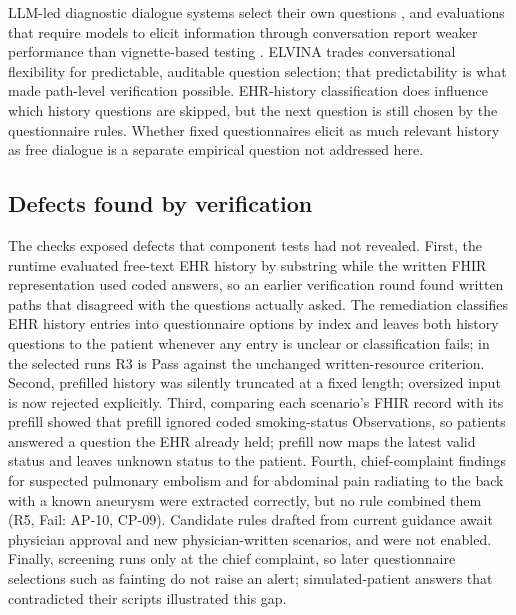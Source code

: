 \documentclass[lineno,pdflatex,sn-basic]{sn-jnl}%
\theoremstyle{thmstyleone}%
\theoremstyle{thmstyletwo}%
\theoremstyle{thmstylethree}%
\newcommand{\RThreeVerdict}{Pass}
\newcommand{\RFiveVerdict}{Fail}
\newcommand{\RFiveFailingScripts}{AP-10, CP-09}
\begin{document}
LLM-led diagnostic dialogue systems select their own questions
\citep{tuConversationalDiagnosticArtificial2025}, and evaluations that require
models to elicit information through conversation report weaker performance than
vignette-based testing \citep{johriCraftMd2025,schmidgallAgentClinic2024}. ELVINA
trades conversational flexibility for predictable, auditable question selection;
that predictability is what made path-level verification possible. EHR-history
classification does influence which history questions are skipped, but the next
question is still chosen by the questionnaire rules. Whether fixed questionnaires
elicit as much relevant history as free dialogue is a separate empirical question
not addressed here.

\subsection{Defects found by verification}
The checks exposed defects that component tests had not revealed. First, the
runtime evaluated free-text EHR history by substring while the written FHIR
representation used coded answers, so an earlier verification round found written
paths that disagreed with the questions actually asked. The remediation classifies
EHR history entries into questionnaire options by index and leaves both history
questions to the patient whenever any entry is unclear or classification fails;
in the selected runs R3 is \RThreeVerdict{} against the unchanged written-resource
criterion. Second, prefilled history was silently truncated at a fixed length;
oversized input is now rejected explicitly. Third, comparing each scenario's FHIR
record with its prefill showed that prefill ignored coded smoking-status
Observations, so patients answered a question the EHR already held; prefill now
maps the latest valid status and leaves unknown status to the patient. Fourth,
chief-complaint findings for
suspected pulmonary embolism and for abdominal pain radiating to the back with a
known aneurysm were extracted correctly, but no rule combined them (R5,
\RFiveVerdict{}: \RFiveFailingScripts{}). Candidate rules drafted from current
guidance \citep{konstantinidesEscPe2020,wanhainenEsvsAaa2024} await physician
approval and new physician-written scenarios, and were not enabled. Finally,
screening runs only at the chief complaint, so later questionnaire selections such
as fainting do not raise an alert; simulated-patient answers that contradicted
their scripts illustrated this gap.
\end{document}

